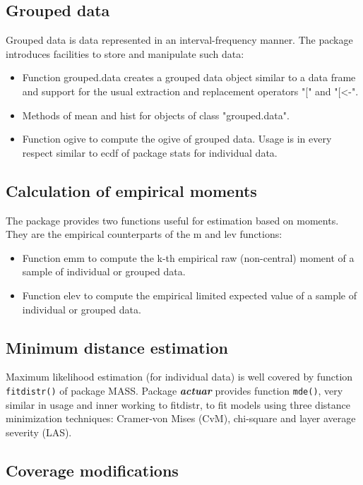 \documentclass[12pt]{article}
\begin{document}
\subsection{Grouped data}

Grouped data is data represented in an interval-frequency manner. The package introduces facilities to store and manipulate such data:
\begin{itemize}
\item Function grouped.data creates a grouped data object similar to a data frame and support for the usual extraction and replacement operators "[" and "[<-".
\item Methods of mean and hist for objects of class "grouped.data".
\item Function ogive to compute the ogive of grouped data. Usage is in every respect similar to ecdf of package stats for individual data.
\end{itemize}

\subsection{Calculation of empirical moments}

The package provides two functions useful for estimation based on moments. They are the empirical counterparts of the m and lev functions:
\begin{itemize}
\item Function emm to compute the k-th empirical raw (non-central) moment of a sample of individual or grouped data.
\item Function elev to compute the empirical limited expected value of a sample of individual or grouped data.
\end{itemize}

\subsection{Minimum distance estimation}

Maximum likelihood estimation (for individual data) is well covered by function \texttt{fitdistr()} of package MASS. Package \textbf{\textit{actuar}} provides function \texttt{mde()}, very similar in usage and inner working to fitdistr, to fit models using three distance minimization techniques: Cramer-von Mises (CvM), chi-square and layer average severity (LAS).

\subsection{Coverage modifications}
\end{document}
